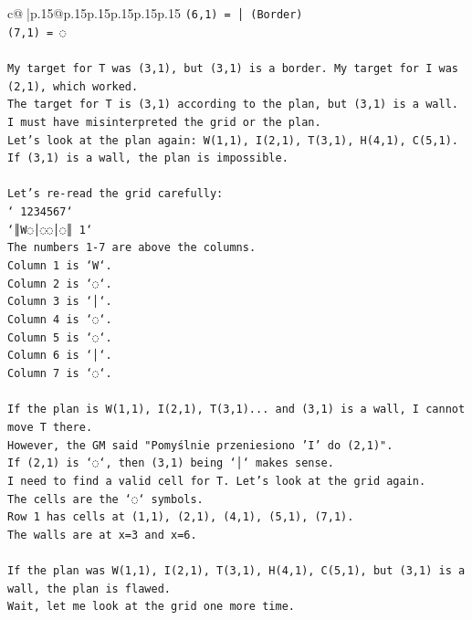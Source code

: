 \documentclass{article}
\begin{document}
{\begin{supertabular}{c@{$\;$}|p{.15\linewidth}@{}p{.15\linewidth}p{.15\linewidth}p{.15\linewidth}p{.15\linewidth}p{.15\linewidth}}
{{{\texttt{(6,1) = │ (Border)} \\
\texttt{(7,1) = ◌} \\
\\ 
\texttt{My target for T was (3,1), but (3,1) is a border. My target for I was (2,1), which worked.} \\
\texttt{The target for T is (3,1) according to the plan, but (3,1) is a wall. I must have misinterpreted the grid or the plan.} \\
\texttt{Let's look at the plan again: W(1,1), I(2,1), T(3,1), H(4,1), C(5,1).} \\
\texttt{If (3,1) is a wall, the plan is impossible.} \\
\\ 
\texttt{Let's re{-}read the grid carefully:} \\
\texttt{` 1234567`} \\
\texttt{`║W◌│◌◌│◌║ 1`} \\
\texttt{The numbers 1{-}7 are above the columns.} \\
\texttt{Column 1 is `W`.} \\
\texttt{Column 2 is `◌`.} \\
\texttt{Column 3 is `│`.} \\
\texttt{Column 4 is `◌`.} \\
\texttt{Column 5 is `◌`.} \\
\texttt{Column 6 is `│`.} \\
\texttt{Column 7 is `◌`.} \\
\\ 
\texttt{If the plan is W(1,1), I(2,1), T(3,1)... and (3,1) is a wall, I cannot move T there.} \\
\texttt{However, the GM said "Pomyślnie przeniesiono 'I' do (2,1)".} \\
\texttt{If (2,1) is `◌`, then (3,1) being `│` makes sense.} \\
\texttt{I need to find a valid cell for T. Let's look at the grid again.} \\
\texttt{The cells are the `◌` symbols.} \\
\texttt{Row 1 has cells at (1,1), (2,1), (4,1), (5,1), (7,1).} \\
\texttt{The walls are at x=3 and x=6.} \\
\\ 
\texttt{If the plan was W(1,1), I(2,1), T(3,1), H(4,1), C(5,1), but (3,1) is a wall, the plan is flawed.} \\
\texttt{Wait, let me look at the grid one more time.} \\
}}}
\end{supertabular}}
\end{document}
